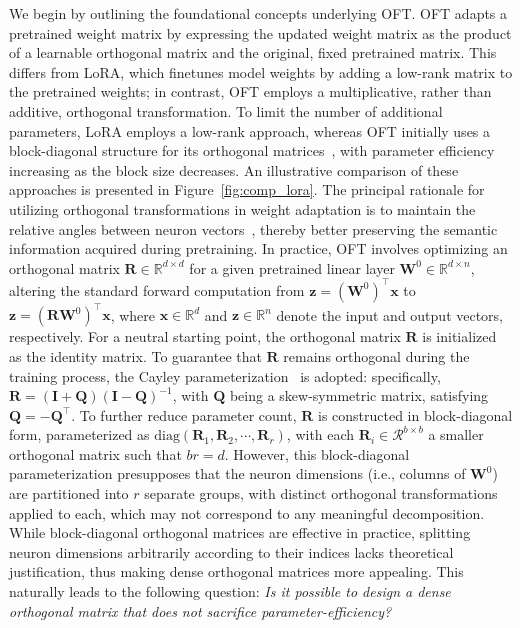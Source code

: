 We begin by outlining the foundational concepts underlying OFT. OFT adapts a pretrained weight matrix by expressing the updated weight matrix as the product of a learnable orthogonal matrix and the original, fixed pretrained matrix. This differs from LoRA, which finetunes model weights by adding a low-rank matrix to the pretrained weights; in contrast, OFT employs a multiplicative, rather than additive, orthogonal transformation. To limit the number of additional parameters, LoRA employs a low-rank approach, whereas OFT initially uses a block-diagonal structure for its orthogonal matrices~\cite{qiu2023controlling}, with parameter efficiency increasing as the block size decreases. An illustrative comparison of these approaches is presented in Figure~\ref{fig:comp_lora}. The principal rationale for utilizing orthogonal transformations in weight adaptation is to maintain the relative angles between neuron vectors~\cite{liu2018learning,liu2021orthogonal,qiu2023controlling}, thereby better preserving the semantic information acquired during pretraining. In practice, OFT involves optimizing an orthogonal matrix $\bm{R}\in\mathbb{R}^{d\times d}$ for a given pretrained linear layer $\bm{W}^0\in\mathbb{R}^{d\times n}$, altering the standard forward computation from $\bm{z}=(\bm{W}^0)^\top\bm{x}$ to $\bm{z}=(\bm{R}\bm{W}^0)^\top\bm{x}$, where $\bm{x}\in\mathbb{R}^d$ and $\bm{z}\in\mathbb{R}^n$ denote the input and output vectors, respectively. For a neutral starting point, the orthogonal matrix $\bm{R}$ is initialized as the identity matrix. To guarantee that $\bm{R}$ remains orthogonal during the training process, the Cayley parameterization~\cite{qiu2023controlling,liu2021orthogonal} is adopted: specifically, $\bm{R} = (\bm{I}+\bm{Q})(\bm{I}-\bm{Q})^{-1}$, with $\bm{Q}$ being a skew-symmetric matrix, satisfying $\bm{Q} = -\bm{Q}^\top$. To further reduce parameter count, $\bm{R}$ is constructed in block-diagonal form, parameterized as $\text{diag}(\bm{R}_1, \bm{R}_2, \cdots, \bm{R}_r)$, with each $\bm{R}_i\in\mathcal{R}^{b\times b}$ a smaller orthogonal matrix such that $br = d$. However, this block-diagonal parameterization presupposes that the neuron dimensions (i.e., columns of $\bm{W}^0$) are partitioned into $r$ separate groups, with distinct orthogonal transformations applied to each, which may not correspond to any meaningful decomposition. While block-diagonal orthogonal matrices are effective in practice, splitting neuron dimensions arbitrarily according to their indices lacks theoretical justification, thus making dense orthogonal matrices more appealing. This naturally leads to the following question: \emph{Is it possible to design a dense orthogonal matrix that does not sacrifice parameter-efficiency?}

